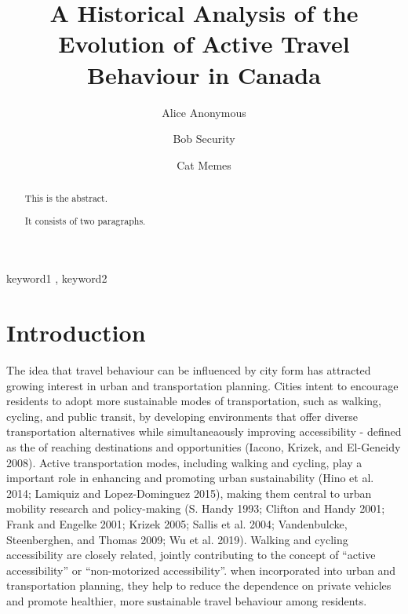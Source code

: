\documentclass[preprint, 3p,
authoryear]{elsarticle} %
\begin{document}
\begin{frontmatter}

  \title{A Historical Analysis of the Evolution of Active Travel
Behaviour in Canada}
    \author[Some Institute of Technology]{Alice Anonymous%
  }
    \author[Some Institute of Technology]{Bob Security%
  }
    \author[Some Institute of Technology]{Cat Memes%
  }
  
  \begin{abstract}
  This is the abstract.

  It consists of two paragraphs.
  \end{abstract}
    \begin{keyword}
    keyword1 \sep 
    keyword2
  \end{keyword}
  
 \end{frontmatter}

\hypertarget{introduction}{%
\section{Introduction}\label{introduction}}

The idea that travel behaviour can be influenced by city form has
attracted growing interest in urban and transportation planning. Cities
intent to encourage residents to adopt more sustainable modes of
transportation, such as walking, cycling, and public transit, by
developing environments that offer diverse transportation alternatives
while simultaneaously improving accessibility - defined as the of
reaching destinations and opportunities (Iacono, Krizek, and El-Geneidy
2008). Active transportation modes, including walking and cycling, play
a important role in enhancing and promoting urban sustainability (Hino
et al. 2014; Lamiquiz and Lopez-Dominguez 2015), making them central to
urban mobility research and policy-making (S. Handy 1993; Clifton and
Handy 2001; Frank and Engelke 2001; Krizek 2005; Sallis et al. 2004;
Vandenbulcke, Steenberghen, and Thomas 2009; Wu et al. 2019). Walking
and cycling accessibility are closely related, jointly contributing to
the concept of ``active accessibility'' or ``non-motorized
accessibility''. when incorporated into urban and transportation
planning, they help to reduce the dependence on private vehicles and
promote healthier, more sustainable travel behaviour among residents.
\end{document}
